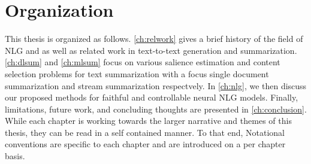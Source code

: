 \section{Organization}

This thesis is organized as follows. \autoref{ch:relwork} gives a brief history
of the field of NLG and as well as related work in text-to-text generation and
summarization. \autoref{ch:dlsum} and \autoref{ch:mlsum} focus on various
salience estimation and content selection problems for text summarization with
a focus single document summarization and stream summarization respectvely. In
\autoref{ch:nlg}, we then discuss our proposed methods for faithful and
controllable neural NLG models.  Finally, limitations, future work, and
concluding thoughts are presented in \autoref{ch:conclusion}.  While each
chapter is working towards the larger narrative and themes of this thesis, they
can be read in a self contained manner. To that end, Notational conventions are
specific to each chapter and are introduced on a per chapter basis.
